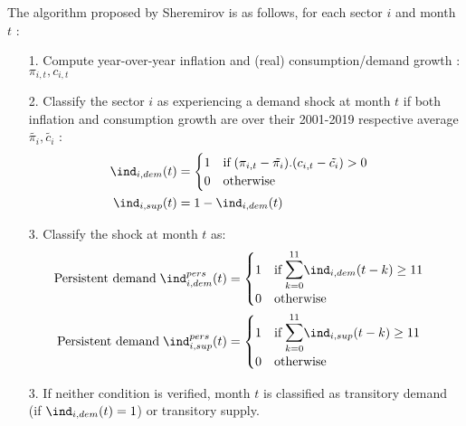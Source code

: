The algorithm proposed by Sheremirov is as follows, for each sector $i$ and month $t$ :
\begin{itemize}
    \item[1.] Compute year-over-year inflation and (real) consumption/demand growth : $\pi_{i,t},c_{i,t}$
    \item[2.] Classify the sector $i$ as experiencing a demand shock at month $t$ if both inflation and consumption growth are over their 2001-2019 respective average $\tilde{\pi_i},\tilde{c_i}$ : 
    \begin{align*}
        \ind_{i,dem}(t) &= \begin{cases} 1 \quad \textrm{if} \; (\pi_{i,t}-\tilde{\pi_i}).(c_{i,t}-\tilde{c_i})>0 \\ 0 \quad \textrm{otherwise} \end{cases} \\ 
        \ind_{i,sup}(t) &= 1 - \ind_{i,dem}(t)
    \end{align*}
    \item[3.] Classify the shock at month $t$ as:
    \begin{align*}
        \textrm{Persistent demand} \; \ind_{i,dem}^{pers}(t) &= \begin{cases} 1 \quad \textrm{if} \; \mathlarger{\mathlarger{\sum}}_{k=0}^{11} \ind_{i,dem}(t-k) \geq 11 \\ 0 \quad \textrm{otherwise} \end{cases} \\ 
        \textrm{Persistent demand} \; \ind_{i,sup}^{pers}(t) &= \begin{cases} 1 \quad \textrm{if} \; \mathlarger{\mathlarger{\sum}}_{k=0}^{11} \ind_{i,sup}(t-k) \geq 11 \\ 0 \quad \textrm{otherwise} \end{cases} \\ 
    \end{align*}
    \item[3.] If neither condition is verified, month $t$ is classified as transitory demand (if $\ind_{i,dem}(t)=1$) or transitory supply.
\end{itemize}